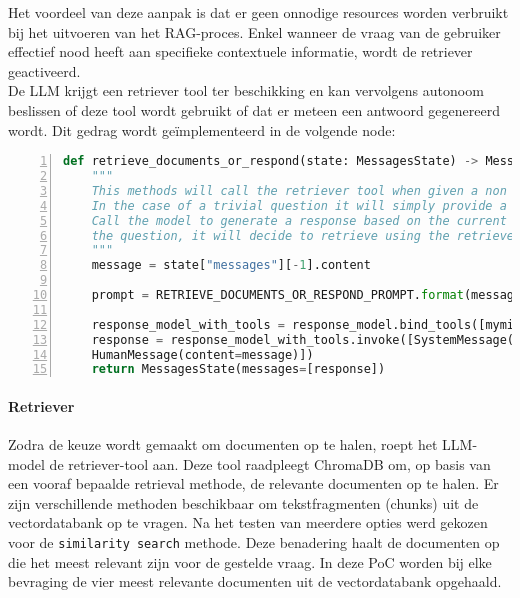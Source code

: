 Het voordeel van deze aanpak is dat er geen onnodige resources worden verbruikt bij het uitvoeren van het RAG-proces. Enkel wanneer de vraag van de gebruiker effectief nood heeft aan specifieke contextuele informatie, wordt de retriever geactiveerd.
\\[1em]
De LLM krijgt een retriever tool ter beschikking en kan vervolgens autonoom beslissen of deze tool wordt gebruikt of dat er meteen een antwoord gegenereerd wordt. Dit gedrag wordt geïmplementeerd in de volgende node:

\begin{lstlisting}[basicstyle=\small, frame=single, breaklines=true, postbreak=\mbox{\textcolor{red}{$\hookrightarrow$}\space}, escapeinside ={\%,}, escapechar={!}, numbers=left, language=Python, caption=Node die keuze maakt tussen om al dan niet te retrieven]
def retrieve_documents_or_respond(state: MessagesState) -> MessagesState:
    """
    This methods will call the retriever tool when given a non trivial question is asked.
    In the case of a trivial question it will simply provide a response
    Call the model to generate a response based on the current state. Given
    the question, it will decide to retrieve using the retriever tool, or simply respond to the user.
    """
    message = state["messages"][-1].content
    
    prompt = RETRIEVE_DOCUMENTS_OR_RESPOND_PROMPT.format(message=message)
    
    response_model_with_tools = response_model.bind_tools([myminfin_retriever_tool])
    response = response_model_with_tools.invoke([SystemMessage(content=prompt),
    HumanMessage(content=message)])
    return MessagesState(messages=[response])
\end{lstlisting}

\paragraph{Retriever}

Zodra de keuze wordt gemaakt om documenten op te halen, roept het LLM-model de retriever-tool aan. Deze tool raadpleegt ChromaDB om, op basis van een vooraf bepaalde retrieval methode, de relevante documenten op te halen. Er zijn verschillende methoden beschikbaar om tekstfragmenten (chunks) uit de vectordatabank op te vragen. Na het testen van meerdere opties werd gekozen voor de \verb|similarity search| methode. Deze benadering haalt de documenten op die het meest relevant zijn voor de gestelde vraag. In deze PoC worden bij elke bevraging de vier meest relevante documenten uit de vectordatabank opgehaald.

